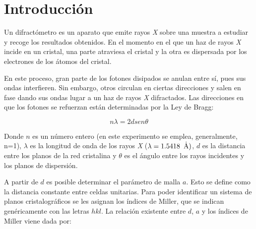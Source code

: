 \documentclass[a4paper,twocolumn,10pt]{article}
\begin{document}

\section{Introducción} %



Un difractómetro es un aparato que emite rayos \textit{X} sobre una muestra a estudiar y recoge los resultados obtenidos. En el momento en el que un haz de rayos \textit{X} incide en un cristal, una parte atraviesa el cristal y la otra es dispersada por los electrones de los átomos del cristal. 

   En este proceso, gran parte de los fotones disipados se anulan entre sí, pues sus ondas interfieren. Sin embargo, otros circulan en ciertas direcciones y salen en fase dando sus ondas lugar a un haz de rayos \textit{X} difractados. Las direcciones en que los fotones se refuerzan están determinadas por la Ley de Bragg:  
   
\begin{equation}
n\lambda = 2dsen\theta  
\end{equation}


Donde $n$ es un número entero (en este experimento se emplea, generalmente, n=1), $\lambda$ es la longitud de onda de los rayos \textit{X} ($\lambda = 1.5418 \rm \textcolor{white}{a} \dot{A})$, $d$ es la distancia entre los planos de la red cristalina y $\theta$ es el ángulo entre los rayos incidentes y los planos de dispersión.

A partir de $d$ es posible determinar el parámetro de malla $a$. Esto se define como la distancia constante entre celdas unitarias. Para poder identificar un sistema de planos cristalográficos se les asignan los índices de Miller, que se indican genéricamente con las letras $hkl$. La relación existente entre $d$, $a$ y los índices de Miller viene dada por:
\end{document}
